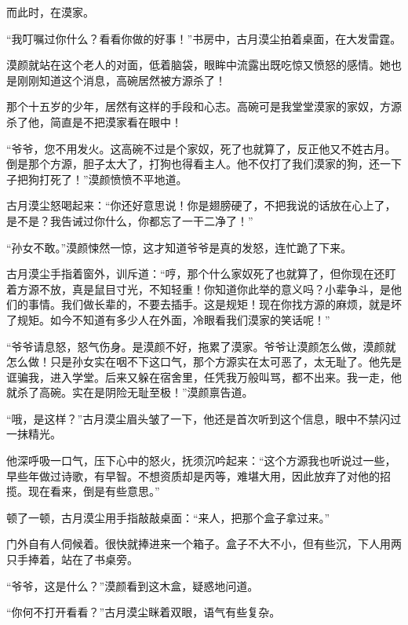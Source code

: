 
\begin{this_body}



而此时，在漠家。

“我叮嘱过你什么？看看你做的好事！”书房中，古月漠尘拍着桌面，在大发雷霆。

漠颜就站在这个老人的对面，低着脑袋，眼眸中流露出既吃惊又愤怒的感情。她也是刚刚知道这个消息，高碗居然被方源杀了！

那个十五岁的少年，居然有这样的手段和心志。高碗可是我堂堂漠家的家奴，方源杀了他，简直是不把漠家看在眼中！

“爷爷，您不用发火。这高碗不过是个家奴，死了也就算了，反正他又不姓古月。倒是那个方源，胆子太大了，打狗也得看主人。他不仅打了我们漠家的狗，还一下子把狗打死了！”漠颜愤愤不平地道。

古月漠尘怒喝起来：“你还好意思说！你是翅膀硬了，不把我说的话放在心上了，是不是？我告诫过你什么，你都忘了一干二净了！”

“孙女不敢。”漠颜悚然一惊，这才知道爷爷是真的发怒，连忙跪了下来。

古月漠尘手指着窗外，训斥道：“哼，那个什么家奴死了也就算了，但你现在还盯着方源不放，真是鼠目寸光，不知轻重！你知道你此举的意义吗？小辈争斗，是他们的事情。我们做长辈的，不要去插手。这是规矩！现在你找方源的麻烦，就是坏了规矩。如今不知道有多少人在外面，冷眼看我们漠家的笑话呢！”

“爷爷请息怒，怒气伤身。是漠颜不好，拖累了漠家。爷爷让漠颜怎么做，漠颜就怎么做！只是孙女实在咽不下这口气，那个方源实在太可恶了，太无耻了。他先是诓骗我，进入学堂。后来又躲在宿舍里，任凭我万般叫骂，都不出来。我一走，他就杀了高碗。实在是阴险无耻至极！”漠颜禀告道。

“哦，是这样？”古月漠尘眉头皱了一下，他还是首次听到这个信息，眼中不禁闪过一抹精光。

他深呼吸一口气，压下心中的怒火，抚须沉吟起来：“这个方源我也听说过一些，早些年做过诗歌，有早智。不想资质却是丙等，难堪大用，因此放弃了对他的招揽。现在看来，倒是有些意思。”

顿了一顿，古月漠尘用手指敲敲桌面：“来人，把那个盒子拿过来。”

门外自有人伺候着。很快就捧进来一个箱子。盒子不大不小，但有些沉，下人用两只手捧着，站在了书桌旁。

“爷爷，这是什么？”漠颜看到这木盒，疑惑地问道。

“你何不打开看看？”古月漠尘眯着双眼，语气有些复杂。


\end{this_body}
